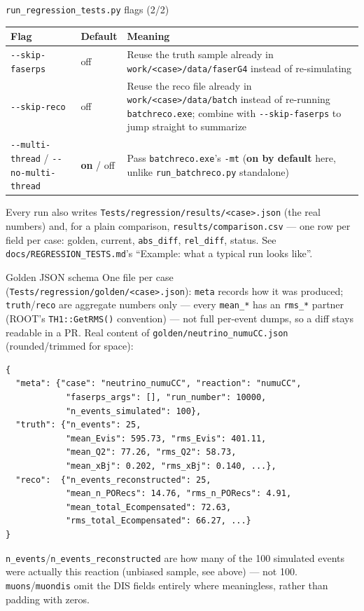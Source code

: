 \documentclass[aspectratio=169]{beamer}
\begin{document}
\begin{frame}{\texttt{run\_regression\_tests.py} flags (2/2)}
  \centering
  \scriptsize
  \begin{tabular}{@{}p{3.0cm}p{1.6cm}p{6.2cm}@{}}
    \toprule
    \textbf{Flag} & \textbf{Default} & \textbf{Meaning} \\
    \midrule
    \texttt{-{}-skip-faserps} & off & Reuse the truth sample already in
      \texttt{work/<case>/data/faserG4} instead of re-simulating \\
    \texttt{-{}-skip-reco} & off & Reuse the reco file already in
      \texttt{work/<case>/data/batch} instead of re-running
      \texttt{batchreco.exe}; combine with \texttt{-{}-skip-faserps} to
      jump straight to summarize \\
    \texttt{-{}-multi-thread} / \texttt{-{}-no-multi-thread} &
      \textbf{on} / off & Pass \texttt{batchreco.exe}'s \texttt{-mt}
      (\textbf{on by default} here, unlike \texttt{run\_batchreco.py}
      standalone) \\
    \bottomrule
  \end{tabular}
  \vspace{0.3cm}
  \footnotesize Every run also writes
  \texttt{Tests/regression/results/<case>.json} (the real numbers) and,
  for a plain comparison, \texttt{results/comparison.csv} --- one row per
  field per case: golden, current, \texttt{abs\_diff}, \texttt{rel\_diff},
  status. See \texttt{docs/REGRESSION\_TESTS.md}'s ``Example: what a
  typical run looks like''.
\end{frame}

\begin{frame}[fragile]{Golden JSON schema}
  \footnotesize
  One file per case (\texttt{Tests/regression/golden/<case>.json}):
  \texttt{meta} records how it was produced; \texttt{truth}/\texttt{reco}
  are aggregate numbers only --- every \texttt{mean\_*} has an
  \texttt{rms\_*} partner (ROOT's \texttt{TH1::GetRMS()} convention) ---
  not full per-event dumps, so a diff stays readable in a PR. Real content
  of \texttt{golden/neutrino\_numuCC.json} (rounded/trimmed for space):
\begin{lstlisting}[basicstyle=\ttfamily\tiny]
{
  "meta": {"case": "neutrino_numuCC", "reaction": "numuCC",
            "faserps_args": [], "run_number": 10000,
            "n_events_simulated": 100},
  "truth": {"n_events": 25,
            "mean_Evis": 595.73, "rms_Evis": 401.11,
            "mean_Q2": 77.26, "rms_Q2": 58.73,
            "mean_xBj": 0.202, "rms_xBj": 0.140, ...},
  "reco":  {"n_events_reconstructed": 25,
            "mean_n_PORecs": 14.76, "rms_n_PORecs": 4.91,
            "mean_total_Ecompensated": 72.63,
            "rms_total_Ecompensated": 66.27, ...}
}
\end{lstlisting}
  \texttt{n\_events}/\texttt{n\_events\_reconstructed} are how many of
  the 100 simulated events were actually this reaction (unbiased sample,
  see above) --- not 100. \texttt{muons}/\texttt{muondis} omit the DIS
  fields entirely where meaningless, rather than padding with zeros.
\end{frame}
\end{document}
